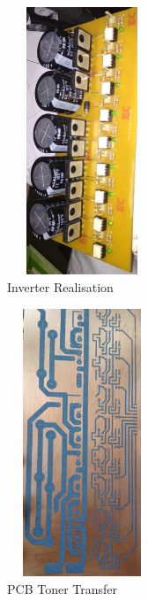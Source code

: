 \documentclass[12pt,a4paper]{report}
\begin{document}
\noindent\begin{minipage}{5.3cm}
	\begin{figure}[H]
		\begin{center}
			\includegraphics[width=4.5cm,height=8cm]{figures/inverter_art.jpg}
		\end{center}
		\caption{Inverter Realisation}\label{DSPQ}
	\end{figure}
\end{minipage}
\begin{minipage}{5.3cm}
	\begin{figure}[H]
		\begin{center}
			\includegraphics[width=4.5cm,height=8cm]{figures/invertert.jpg}
		\end{center}
		\caption{PCB Toner Transfer}\label{DSPW}
	\end{figure}
\end{minipage}
\end{document}
